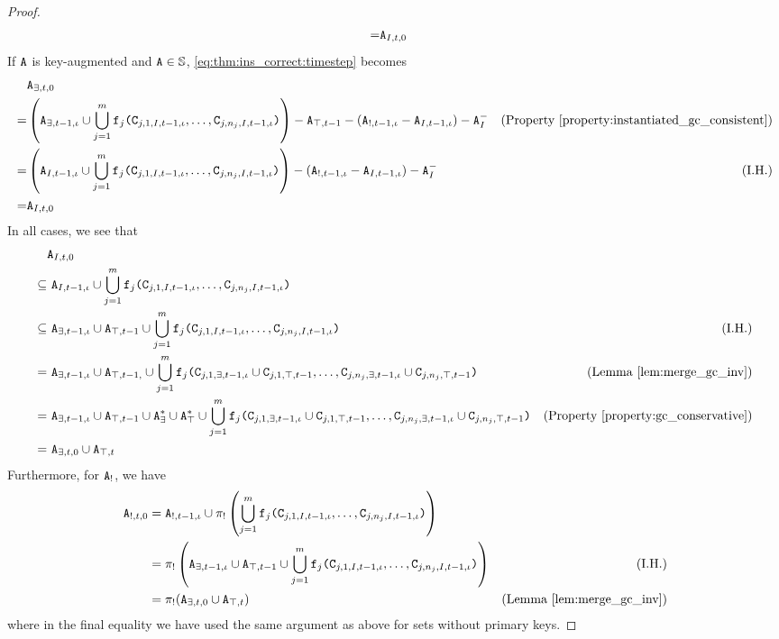 \begin{proof}
\begin{align*}
=& \tt{A}_{I,t,0}
\end{align*}
If $\tt{A}$ is key-augmented and $\tt{A} \in \mathbb{S}$, \eqref{eq:thm:ins_correct:timestep} becomes
\begin{align*}
&\tt{A}_{\exists,t,0}\\
=& \left(\tt{A}_{\exists,t-1,\iota} \cup \bigcup_{j=1}^m \tt{f}_j\tt{(}\tt{C}_{j,1,I,t-1,\iota}, \dots, \tt{C}_{j,n_j,I,t-1,\iota}\tt{)}\right)
- \tt{A}_{\top,t-1} - (\tt{A}_{!,t-1,\iota} - \tt{A}_{I,t-1,\iota}) - \tt{A}_I^- & \text{(Property \ref{property:instantiated_gc_consistent})} 
\\
=& \left(\tt{A}_{I,t-1,\iota} \cup \bigcup_{j=1}^m \tt{f}_j\tt{(}\tt{C}_{j,1,I,t-1,\iota}, \dots, \tt{C}_{j,n_j,I,t-1,\iota}\tt{)}\right)
-(\tt{A}_{!,t-1,\iota} - \tt{A}_{I,t-1,\iota}) - \tt{A}_I^- & \text{(I.H.)}\\
=& \tt{A}_{I,t,0}
\end{align*}
In all cases, we see that
\begin{align*}
&\tt{A}_{I,t,0}\\
\subseteq&~ \tt{A}_{I,t-1,\iota} \cup \bigcup_{j=1}^m \tt{f}_j\tt{(}\tt{C}_{j,1,I,t-1,\iota}, \dots, \tt{C}_{j,n_j,I,t-1,\iota}\tt{)} \\
\subseteq&~ \tt{A}_{\exists,t-1,\iota} \cup \tt{A}_{\top,t-1} \cup \bigcup_{j=1}^m \tt{f}_j\tt{(}\tt{C}_{j,1,I,t-1,\iota}, \dots, \tt{C}_{j,n_j,I,t-1,\iota}\tt{)} & \text{(I.H.)} \\
=&~ \tt{A}_{\exists,t-1,\iota} \cup \tt{A}_{\top,t-1,} \cup \bigcup_{j=1}^m \tt{f}_j\tt{(}\tt{C}_{j,1,\exists,t-1,\iota} \cup \tt{C}_{j,1,\top,t-1}, \dots, \tt{C}_{j,n_j,\exists,t-1,\iota} \cup \tt{C}_{j,n_j,\top,t-1}\tt{)} & \text{(Lemma \ref{lem:merge_gc_inv})} \\
=&~ \tt{A}_{\exists,t-1,\iota} \cup \tt{A}_{\top,t-1} \cup \tt{A}_\exists^* \cup \tt{A}_\top^* \cup \bigcup_{j=1}^m \tt{f}_j\tt{(}\tt{C}_{j,1,\exists,t-1,\iota} \cup \tt{C}_{j,1,\top,t-1}, \dots, \tt{C}_{j,n_j,\exists,t-1,\iota} \cup \tt{C}_{j,n_j,\top,t-1}\tt{)} & \text{(Property \ref{property:gc_conservative})}\\
=&~ \tt{A}_{\exists,t,0} \cup \tt{A}_{\top,t}
\end{align*}
Furthermore, for $\tt{A}_!$, we have
\begin{align*}
\tt{A}_{!,t,0}
&= \tt{A}_{!,t-1,\iota} \cup \pi_!\left(\bigcup_{j=1}^m \tt{f}_j\tt{(}\tt{C}_{j,1,I,t-1,\iota}, \dots, \tt{C}_{j,n_j,I,t-1,\iota}\tt{)}\right)\\
&= \pi_!\left(\tt{A}_{\exists,t-1,\iota} \cup \tt{A}_{\top,t-1} \cup \bigcup_{j=1}^m \tt{f}_j\tt{(}\tt{C}_{j,1,I,t-1,\iota}, \dots, \tt{C}_{j,n_j,I,t-1,\iota}\tt{)}\right) & \text{(I.H.)} \\
&= \pi_!(\tt{A}_{\exists,t,0} \cup \tt{A}_{\top,t}) & \text{(Lemma \ref{lem:merge_gc_inv})}
\end{align*}
where in the final equality we have used the same argument as above for sets without primary keys.
\end{proof}

